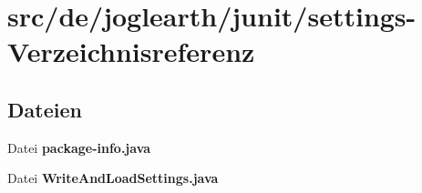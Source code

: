 \section{src/de/joglearth/junit/settings-\/\-Verzeichnisreferenz}
\label{dir_c261101898c687f34236dad9f14401c1}
\subsection*{Dateien}
\begin{DoxyCompactItemize}
\item 
Datei {\bfseries package-\/info.\-java}
\item 
Datei {\bfseries Write\-And\-Load\-Settings.\-java}
\end{DoxyCompactItemize}
